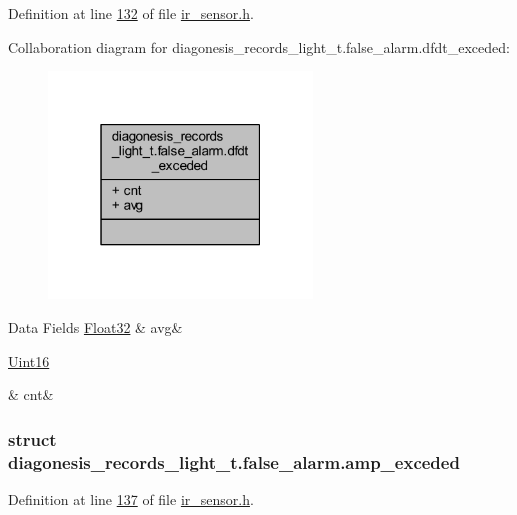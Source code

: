 Definition at line \hyperlink{a00017_source_l00132}{132} of file \hyperlink{a00017_source}{ir\+\_\+sensor.\+h}.



Collaboration diagram for diagonesis\+\_\+records\+\_\+light\+\_\+t.\+false\+\_\+alarm.\+dfdt\+\_\+exceded\+:\nopagebreak
\begin{figure}[H]
\begin{center}
\leavevmode
\includegraphics[width=199pt]{dc/d92/a00929}
\end{center}
\end{figure}
\begin{DoxyFields}{Data Fields}
\hypertarget{a00017_ae322d423f075b0ab2daad27011d24909}{\hyperlink{a00072_a87d38f886e617ced2698fc55afa07637}{Float32}}\label{a00017_ae322d423f075b0ab2daad27011d24909}
&
avg&
\\
\hline

\hypertarget{a00017_a2817f701d5e1a1181e657251363295fd}{\hyperlink{a00072_a59a9f6be4562c327cbfb4f7e8e18f08b}{Uint16}}\label{a00017_a2817f701d5e1a1181e657251363295fd}
&
cnt&
\\
\hline

\end{DoxyFields}
\label{d4/d13/a00377}
\hypertarget{a00017_d4/d13/a00377}{}
\subsubsection{struct diagonesis\+\_\+records\+\_\+light\+\_\+t.\+false\+\_\+alarm.\+amp\+\_\+exceded}


Definition at line \hyperlink{a00017_source_l00137}{137} of file \hyperlink{a00017_source}{ir\+\_\+sensor.\+h}.



